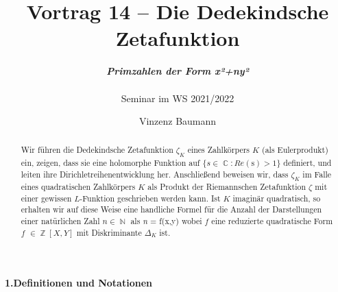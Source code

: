 \documentclass[10pt,a4paper]{article}
\title{\textbf{Vortrag 14} \textbf{-- Die Dedekindsche Zetafunktion}}
\author{ \textit{\textbf{Primzahlen der Form x²+ny²}} \\ \\Seminar im WS 2021/2022}
\date{Vinzenz Baumann}
\DeclareMathOperator{\C}{\mathbb{C}}
\DeclareMathOperator{\Z}{\mathbb{Z}}
\DeclareMathOperator{\N}{\mathbb{N}}
\begin{document}
\maketitle

\begin{abstract}

Wir führen die Dedekindsche Zetafunktion $\zeta_{\textit{K}}$ eines Zahlkörpers $\textit{K}$ (als Eulerprodukt) ein, zeigen, dass sie eine holomorphe Funktion auf  $\{\textit{s}  \in  \C: Re(\text{s})  >  1  \} $ definiert, und leiten ihre Dirichletreihenentwicklung her. Anschließend beweisen wir, dass $\zeta_{\textit{K}}$ im Falle eines quadratischen Zahlkörpers  $\textit{K}$ als Produkt der Riemannschen Zetafunktion $\zeta$ mit einer gewissen $\textit{L}$-Funktion geschrieben werden kann.
Ist $\textit{K}$ imaginär quadratisch, so erhalten wir auf diese Weise eine handliche Formel für die Anzahl der Darstellungen einer natürlichen Zahl $\textit{n} \in \N$ als \textit{n} = f(x,y) wobei $f$ eine reduzierte quadratische Form $f$ $\in \Z[X,Y]$ mit Diskriminante $\Delta_\textit{K}$ ist.



\end{abstract}
\textbf{1.Definitionen und Notationen}
\\
\end{document}
